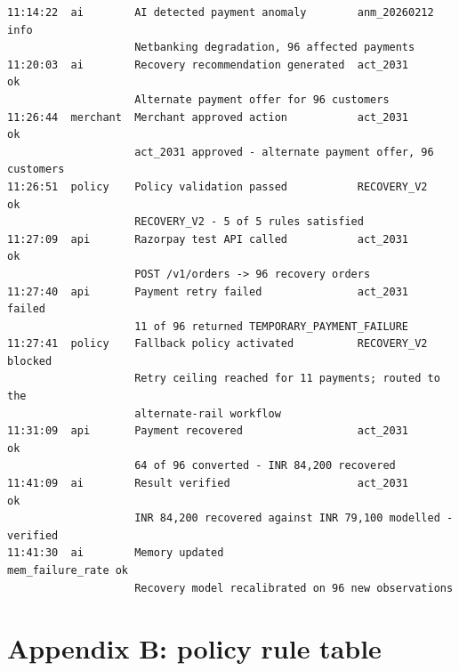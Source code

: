 \documentclass[10pt,twocolumn,a4paper]{article}
\begin{document}
{\footnotesize
\begin{verbatim}
11:14:22  ai        AI detected payment anomaly        anm_20260212    info
                    Netbanking degradation, 96 affected payments
11:20:03  ai        Recovery recommendation generated  act_2031        ok
                    Alternate payment offer for 96 customers
11:26:44  merchant  Merchant approved action           act_2031        ok
                    act_2031 approved - alternate payment offer, 96 customers
11:26:51  policy    Policy validation passed           RECOVERY_V2     ok
                    RECOVERY_V2 - 5 of 5 rules satisfied
11:27:09  api       Razorpay test API called           act_2031        ok
                    POST /v1/orders -> 96 recovery orders
11:27:40  api       Payment retry failed               act_2031        failed
                    11 of 96 returned TEMPORARY_PAYMENT_FAILURE
11:27:41  policy    Fallback policy activated          RECOVERY_V2     blocked
                    Retry ceiling reached for 11 payments; routed to the
                    alternate-rail workflow
11:31:09  api       Payment recovered                  act_2031        ok
                    64 of 96 converted - INR 84,200 recovered
11:41:09  ai        Result verified                    act_2031        ok
                    INR 84,200 recovered against INR 79,100 modelled - verified
11:41:30  ai        Memory updated                     mem_failure_rate ok
                    Recovery model recalibrated on 96 new observations
\end{verbatim}
}


\section{Appendix B: policy rule table}
\end{document}
